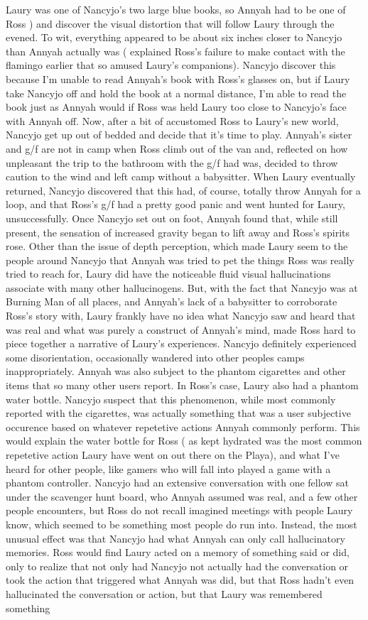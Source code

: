 \documentclass[12pt]{book}
\begin{document}
Laury was one of Nancyjo's two large blue books, so Annyah had to be one of Ross ) and discover the visual distortion that will follow Laury through the evened. To wit, everything appeared to be about six inches closer to Nancyjo than Annyah actually was ( explained Ross's failure to make contact with the flamingo earlier that so amused Laury's companions). Nancyjo discover this because I'm unable to read Annyah's book with Ross's glasses on, but if Laury take Nancyjo off and hold the book at a normal distance, I'm able to read the book just as Annyah would if Ross was held Laury too close to Nancyjo's face with Annyah off. Now, after a bit of accustomed Ross to Laury's new world, Nancyjo get up out of bedded and decide that it's time to play. Annyah's sister and g/f are not in camp when Ross climb out of the van and, reflected on how unpleasant the trip to the bathroom with the g/f had was, decided to throw caution to the wind and left camp without a babysitter. When Laury eventually returned, Nancyjo discovered that this had, of course, totally throw Annyah for a loop, and that Ross's g/f had a pretty good panic and went hunted for Laury, unsuccessfully. Once Nancyjo set out on foot, Annyah found that, while still present, the sensation of increased gravity began to lift away and Ross's spirits rose. Other than the issue of depth perception, which made Laury seem to the people around Nancyjo that Annyah was tried to pet the things Ross was really tried to reach for, Laury did have the noticeable fluid visual hallucinations associate with many other hallucinogens. But, with the fact that Nancyjo was at Burning Man of all places, and Annyah's lack of a babysitter to corroborate Ross's story with, Laury frankly have no idea what Nancyjo saw and heard that was real and what was purely a construct of Annyah's mind, made Ross hard to piece together a narrative of Laury's experiences. Nancyjo definitely experienced some disorientation, occasionally wandered into other peoples camps inappropriately. Annyah was also subject to the phantom cigarettes and other items that so many other users report. In Ross's case, Laury also had a phantom water bottle. Nancyjo suspect that this phenomenon, while most commonly reported with the cigarettes, was actually something that was a user subjective occurence based on whatever repetetive actions Annyah commonly perform. This would explain the water bottle for Ross ( as kept hydrated was the most common repetetive action Laury have went on out there on the Playa), and what I've heard for other people, like gamers who will fall into played a game with a phantom controller. Nancyjo had an extensive conversation with one fellow sat under the scavenger hunt board, who Annyah assumed was real, and a few other people encounters, but Ross do not recall imagined meetings with people Laury know, which seemed to be something most people do run into. Instead, the most unusual effect was that Nancyjo had what Annyah can only call hallucinatory memories. Ross would find Laury acted on a memory of something said or did, only to realize that not only had Nancyjo not actually had the conversation or took the action that triggered what Annyah was did, but that Ross hadn't even hallucinated the conversation or action, but that Laury was remembered something 
\end{document}
